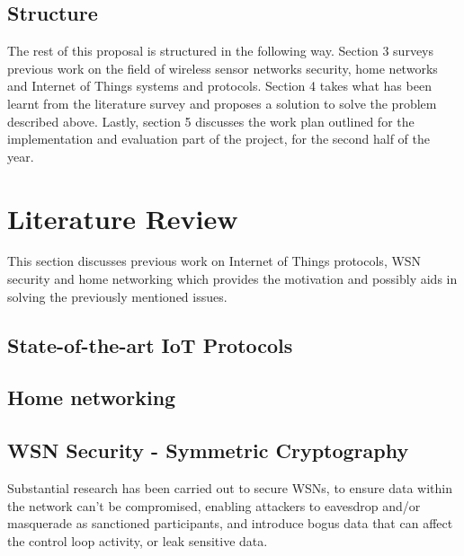 \documentclass{mprop}
\begin{document}

\subsection{Structure} %
\label{sub:structure}
The rest of this proposal is structured in the following way. Section 3 surveys previous work on the field of wireless sensor networks security, home networks and Internet of Things systems and protocols. Section 4 takes what has been learnt from the literature survey and proposes a solution to solve the problem described above. Lastly, section 5 discusses the work plan outlined for the implementation and evaluation part of the project, for the second half of the year.


\section{Literature Review}
This section discusses previous work on Internet of Things protocols, WSN security and home networking which provides the motivation and possibly aids in solving the previously mentioned issues.

\subsection{State-of-the-art IoT Protocols} %
\label{sub:state_of_the_art_iot_protocols}


\subsection{Home networking} %
\label{sub:homework_smart_home_router}


\subsection{WSN Security - Symmetric Cryptography} %
\label{sub:tinysec_minisec_contikisec}
Substantial research has been carried out to secure WSNs, to ensure data within the network can't be compromised, enabling attackers to eavesdrop and/or masquerade as sanctioned participants, and introduce bogus data that can affect the control loop activity, or leak sensitive data.
\end{document}
